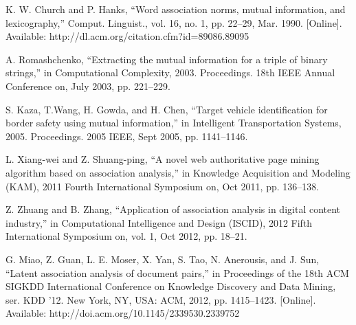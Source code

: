 \begin{thebibliography}{99.}
 K. W. Church and P. Hanks, “Word association norms, mutual information, and lexicography,” Comput. Linguist., vol. 16, no. 1, pp. 22–29, Mar. 1990. [Online]. Available: http://dl.acm.org/citation.cfm?id=89086.89095

 A. Romashchenko, “Extracting the mutual information for a triple of binary strings,” in Computational Complexity, 2003. Proceedings. 18th IEEE Annual Conference on, July 2003, pp. 221–229.

 S. Kaza, T.Wang, H. Gowda, and H. Chen, “Target vehicle identification for border safety using mutual information,” in Intelligent Transportation Systems, 2005. Proceedings. 2005 IEEE, Sept 2005, pp. 1141–1146.

 L. Xiang-wei and Z. Shuang-ping, “A novel web authoritative page mining algorithm based on association analysis,” in Knowledge Acquisition and Modeling (KAM), 2011 Fourth International Symposium on, Oct 2011, pp. 136–138.

 Z. Zhuang and B. Zhang, “Application of association analysis in digital content industry,” in Computational Intelligence and Design (ISCID), 2012 Fifth International Symposium on, vol. 1, Oct 2012, pp. 18–21.

 G. Miao, Z. Guan, L. E. Moser, X. Yan, S. Tao, N. Anerousis, and J. Sun, “Latent association analysis of document pairs,” in Proceedings of the 18th ACM SIGKDD International Conference on Knowledge Discovery and Data Mining, ser. KDD ’12. New York, NY, USA: ACM, 2012, pp. 1415–1423. [Online]. Available: http://doi.acm.org/10.1145/2339530.2339752






\end{thebibliography}
